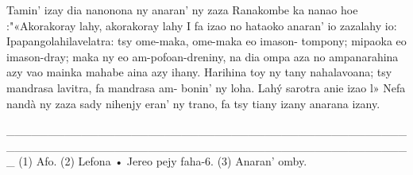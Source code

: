 Tamin' izay dia nanonona ny anaran' ny zaza Ranakombe ka nanao
hoe :"«Akorakoray lahy, akorakoray lahy I fa izao no hataoko anaran' io
zazalahy io: Ipapangolahilavelatra: tsy ome-maka, ome-maka eo imason-
tompony; mipaoka eo imason-dray; maka ny eo am-pofoan-dreniny, na dia
ompa aza no ampanarahina azy vao mainka mahabe aina azy ihany.
Harihina toy ny tany nahalavoana; tsy mandrasa lavitra, fa mandrasa am-
bonin' ny loha. Lahý sarotra anie izao l» Nefa nandà ny zaza sady nihenjy
eran' ny trano, fa tsy tiany izany anarana izany.

_________________________________________________________________________________________________
(1) Afo. 
(2) Lefona • Jereo pejy faha-6. 
(3) Anaran' omby.